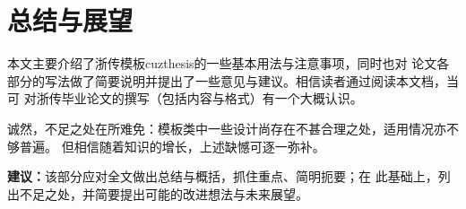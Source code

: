 \chapter{总结与展望}\label{chap:conclusions}

本文主要介绍了浙传模板cuzthesis的一些基本用法与注意事项，同时也对
论文各部分的写法做了简要说明并提出了一些意见与建议。相信读者通过阅读本文档，当可
对浙传毕业论文的撰写（包括内容与格式）有一个大概认识。

诚然，不足之处在所难免：模板类中一些设计尚存在不甚合理之处，适用情况亦不够普遍。
但相信随着知识的增长，上述缺憾可逐一弥补。

\begin{leftbar}
    \noindent\textbf{建议：}该部分应对全文做出总结与概括，抓住重点、简明扼要；在
    此基础上，列出不足之处，并简要提出可能的改进想法与未来展望。
\end{leftbar}